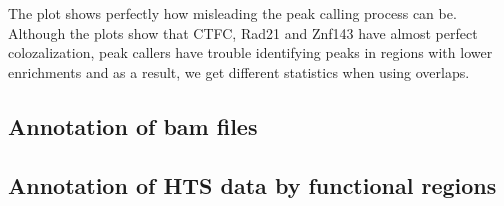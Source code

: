 \documentclass{article}\usepackage[]{graphicx}\usepackage[]{color}
\begin{document}
The plot shows perfectly how misleading the peak calling process can be. 
Although the plots show that CTFC, Rad21 and Znf143 have almost perfect 
colozalization, peak callers have trouble identifying peaks in regions with 
lower enrichments and as a  result, we get different statistics 
when using overlaps.

\subsection{Annotation of bam files}


\subsection{Annotation of HTS data by functional regions}
\end{document}
